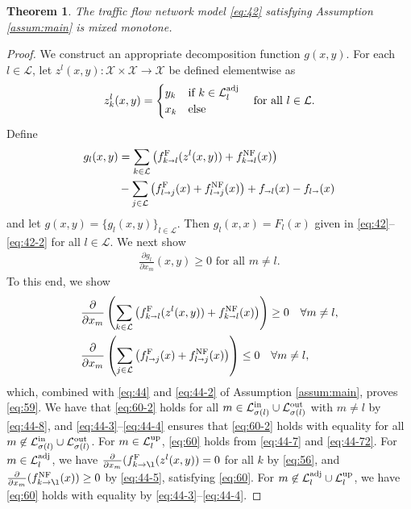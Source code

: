 \documentclass[letterpaper, 10 pt, conference]{ieeeconf}
\newcommand{\sra}{\shortrightarrow}
\newtheorem{thm}{Theorem}
\newcommand{\Links}{\mathcal{L}}
\newcommand{\Lin}{\mathcal{L}^\textnormal{in}}
\newcommand{\Lout}{\mathcal{L}^\textnormal{out}}
\newcommand{\Lup}{\mathcal{L}^\textnormal{up}}
\newcommand{\Ladj}{\mathcal{L}^\textnormal{adj}}
\newcommand{\head}{{\sigma}}
\newcommand{\Dom}{\mathcal{X}}
\begin{document}
\begin{thm}
\label{thm:MM}
The traffic flow network model \eqref{eq:42} satisfying Assumption \ref{assum:main} is mixed monotone.
\end{thm}
\begin{proof}
  We construct an appropriate decomposition function $g(x,y)$. For each $l\in\Links$, let 
$  z^l(x,y): \Dom\times\Dom\to\Dom$
be defined elementwise as
\begin{align}
  \label{eq:56}
  z^l_k(x,y)=
  \begin{cases}
    y_k&\text{if }k\in\Ladj_l\\
    x_k&\text{else}
  \end{cases}
\quad \text{for all }l\in\Links.
\end{align}
Define 
\begin{align}
\nonumber  g_l(x,y)&=\sum_{k\in\Links} \left(\fF_{k\sra l}(z^l(x,y))+\fNF_{k\sra l}(x)\right)\\
  \label{eq:58}&-\sum_{j\in\Links}\left(\fF_{l\sra j}(x)+\fNF_{l\sra j}(x)\right)+f_{\sra l}(x) - f_{l\sra }(x)
\end{align}
and let $g(x,y)=\{g_l(x,y)\}_{l\in\Links}$. Then $g_l(x,x)=F_l(x)$ given in \eqref{eq:42}--\eqref{eq:42-2} for all $l\in\Links$.
We next show
\begin{align}
  \label{eq:59}
\frac{\partial g_l}{\partial x_m}(x,y)\geq 0 \text{ for all } m\neq l.
\end{align}
To this end, we show
\begin{align}
  \label{eq:60}
&  \frac{\partial}{\partial x_m}\left(\sum_{k\in\Links} \left(\fF_{k\sra l}(z^l(x,y))+\fNF_{k\sra l}(x)\right)\right) \geq 0\quad \forall m\neq l,\\
&  \label{eq:60-2}  \frac{\partial}{\partial x_m}\left(\sum_{j\in\Links}\left(\fF_{l\sra j}(x)+\fNF_{l\sra j}(x)\right)\right) \leq 0\quad \forall m\neq l,
\end{align}
which, combined with \ref{eq:44} and \ref{eq:44-2} of Assumption \ref{assum:main}, proves \eqref{eq:59}.  We have that \eqref{eq:60-2} holds for all $m\in\Lin_{\head(l)}\cup\Lout_{\head(l)}$ with $m\neq l$ by \ref{eq:44-8}, and \ref{eq:44-3}--\ref{eq:44-4} ensures that \eqref{eq:60-2} holds with equality for all $m\not\in\Lin_{\head(l)}\cup\Lout_{\head(l)}$. For $m\in\Lup_l$, \eqref{eq:60} holds from \ref{eq:44-7} and \ref{eq:44-72}. For $m\in\Ladj_l$, we have $\frac{\partial}{\partial x_m}(\fF_{k\to\l}(z^l(x,y))=0$ for all $k$ by \eqref{eq:56}, and $\frac{\partial}{\partial x_m}(\fNF_{k\to\l}(x))\geq 0$ by \ref{eq:44-5}, satisfying \eqref{eq:60}. For $m\not\in \Ladj_l\cup\Lup_l$, we have \eqref{eq:60} holds with equality by \ref{eq:44-3}--\ref{eq:44-4}.


\end{proof}
\end{document}
